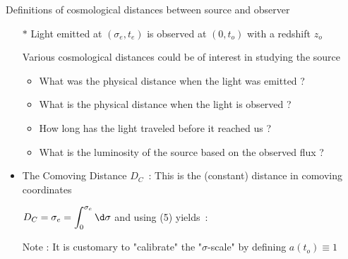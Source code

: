 \Tr
\onecolumn
\begin{center}
{\red Definitions of cosmological distances between source and observer}
\end{center}
% 
\begin{itemize}
\item[$\ast$] Light emitted at $(\sigma_{e},t_{e})$ is observed at $(0,t_{o})$ with a redshift $z_{o}$
\item[] Various cosmological distances could be of interest in studying the source
\begin{itemize}
\item What was the physical distance when the light was emitted ?
\item What is the physical distance when the light is observed ?
\item How long has the light traveled before it reached us ?
\item What is the luminosity of the source based on the observed flux ?
\end{itemize}
\item The {\blue Comoving Distance $D_{C}$}~: This is the (constant) distance in comoving coordinates
\item[] $\displaystyle D_{C}=\sigma_{e}=\int_{0}^{\sigma_{e}}\d\sigma$ and using (5) yields~:
\item[] \begin{center}
        {\red {}}
        \end{center}
\item[] Note : It is customary to "calibrate" the "$\sigma$-scale" by defining $a(t_{o}) \equiv 1$
\end{itemize}

